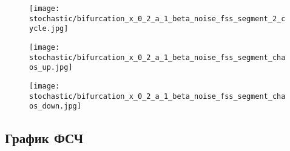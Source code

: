         \begin{figure}
            \centering
            \texttt{[image: stochastic/bifurcation\_x\_0\_2\_a\_1\_beta\_noise\_fss\_segment\_2\_cycle.jpg]}
        
            \captionsetup{justification=centering}
            \caption{}
            \label{bifurcation_x_0_2_a_1_beta_chaos_fss_segment_2_cycle}
        \end{figure}

        \begin{figure}
            \centering
            \texttt{[image: stochastic/bifurcation\_x\_0\_2\_a\_1\_beta\_noise\_fss\_segment\_chaos\_up.jpg]}
        
            \captionsetup{justification=centering}
            \caption{}
            \label{bifurcation_x_0_2_a_1_beta_chaos_fss_segment_chaos_up}
        \end{figure}

        \begin{figure}
            \centering
            \texttt{[image: stochastic/bifurcation\_x\_0\_2\_a\_1\_beta\_noise\_fss\_segment\_chaos\_down.jpg]}
        
            \captionsetup{justification=centering}
            \caption{}
            \label{bifurcation_x_0_2_a_1_beta_chaos_fss_segment_chaos_down}
        \end{figure}


    \subsection{График ФСЧ}

        